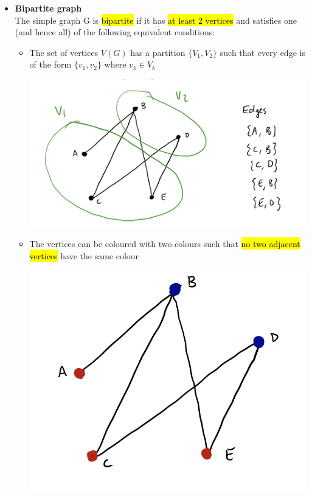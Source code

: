 \documentclass{article}
\begin{document}
\begin{itemize}
\item \textbf{Bipartite graph}\\
The simple graph G is \hl{bipartite} if it has \hl{at least 2 vertices} and satisfies
one (and hence all) of the following equivalent conditions:
\begin{itemize}
\item The set of vertices $V(G)$ has a partition $\{V_1,V_2\}$ such that every edge is of the form $\{v_1,v_2\}$ where $v_k \in V_k$
\begin{center}
\includegraphics[width=0.8\linewidth]{graph/29.jpg} \\%
\end{center}

\item The vertices can be coloured with two colours such that \hl{no two
adjacent vertices} have the same colour\\
\begin{center}
\includegraphics[width=0.7\linewidth]{graph/30.jpg} \\%
\end{center}


\end{itemize}
\end{itemize}
\end{document}
